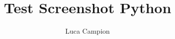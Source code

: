 \documentclass[12pt,a4paper]{book}
\begin{document}
\title{Test Screenshot Python}
\author{Luca Campion}
\maketitle

\tableofcontents


\end{document}
